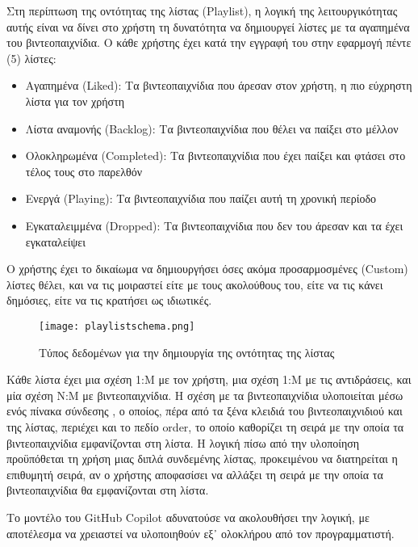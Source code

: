 Στη περίπτωση της οντότητας της λίστας (\textlatin{Playlist}), η λογική
της λειτουργικότητας αυτής είναι να δίνει στο χρήστη τη δυνατότητα να
δημιουργεί λίστες με τα αγαπημένα του βιντεοπαιχνίδια. Ο κάθε χρήστης
έχει κατά την εγγραφή του στην εφαρμογή πέντε (5) λίστες:
\begin{itemize}
  \item
    Αγαπημένα (\textlatin{Liked}): Τα βιντεοπαιχνίδια που άρεσαν στον
    χρήστη, η πιο εύχρηστη λίστα για τον χρήστη
  \item
    Λίστα αναμονής (\textlatin{Backlog}): Τα βιντεοπαιχνίδια που θέλει να
    παίξει στο μέλλον
  \item
    Ολοκληρωμένα (\textlatin{Completed}): Τα βιντεοπαιχνίδια που έχει
    παίξει και φτάσει στο τέλος τους στο παρελθόν
  \item
    Ενεργά (\textlatin{Playing}): Τα βιντεοπαιχνίδια που παίζει αυτή τη
    χρονική περίοδο
  \item
    Εγκαταλειμμένα (\textlatin{Dropped}): Τα βιντεοπαιχνίδια που δεν του
    άρεσαν και τα έχει εγκαταλείψει
\end{itemize}

Ο χρήστης έχει το δικαίωμα να δημιουργήσει όσες ακόμα προσαρμοσμένες
\textlatin{(Custom)} λίστες θέλει, και να τις μοιραστεί είτε με τους
ακολούθους του, είτε να τις κάνει δημόσιες, είτε να τις κρατήσει ως
ιδιωτικές.

\begin{figure}[H]
  \begin{center}
    \texttt{[image: playlistschema.png]}
    \caption{Τύπος δεδομένων για την δημιουργία της οντότητας της
    λίστας}
  \end{center}
  \label{fig:playlistSchema}
\end{figure}

Κάθε λίστα έχει μια σχέση 1:Μ με τον χρήστη, μια σχέση 1:Μ με τις
αντιδράσεις, και μία σχέση Ν:Μ με βιντεοπαιχνίδια. Η σχέση με τα
βιντεοπαιχνίδια υλοποιείται μέσω ενός πίνακα σύνδεσης
\cite{AtlassianJoin}, ο οποίος, πέρα από τα ξένα κλειδιά του
βιντεοπαιχνιδιού και της λίστας, περιέχει και το πεδίο
\textlatin{order}, το οποίο καθορίζει τη σειρά με την οποία τα
βιντεοπαιχνίδια εμφανίζονται στη λίστα. Η λογική πίσω από την υλοποίηση
προϋπόθεται τη χρήση μιας διπλά συνδεμένης λίστας, προκειμένου να
διατηρείται η επιθυμητή σειρά, αν ο χρήστης αποφασίσει να αλλάξει τη
σειρά με την οποία τα βιντεοπαιχνίδια θα εμφανίζονται στη λίστα.

Το μοντέλο του \textlatin{GitHub Copilot} αδυνατούσε να ακολουθήσει την
λογική, με αποτέλεσμα να χρειαστεί να υλοποιηθούν εξ᾽ ολοκλήρου από τον
προγραμματιστή.

